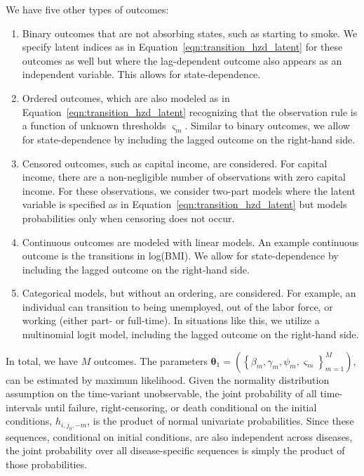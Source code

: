 \noindent We have five other types of outcomes: \\
\begin{enumerate}
\item Binary outcomes that are not absorbing states, such as starting to smoke. We specify latent
indices as in Equation~\ref{eqn:transition_hzd_latent} for these outcomes as well but where
the lag-dependent outcome also appears as an independent variable. This allows for state-dependence.

\item Ordered outcomes, which are also modeled as in Equation~\ref{eqn:transition_hzd_latent} recognizing that the observation rule is
a function of unknown thresholds $\varsigma_m$. Similar to binary outcomes, we allow for state-dependence by including the lagged outcome
on the right-hand side.

\item Censored outcomes, such as capital income, are considered. For capital income,
there are a non-negligible number of observations with zero capital income. For these observations, we consider
two-part models where the latent variable is specified as in Equation~\ref{eqn:transition_hzd_latent} but models
probabilities only when censoring does not occur.

\item Continuous outcomes are modeled with linear models. An example continuous outcome is the
transitions in log(BMI). We allow for state-dependence by including the lagged outcome on the right-hand side.

\item Categorical models, but without an ordering, are considered. For example, an individual can transition
to being unemployed, out of the labor force, or working (either part- or full-time). In situations like this, we utilize
a multinomial logit model, including the lagged outcome on the right-hand side.

\end{enumerate}

\noindent In total, we have $M$ outcomes. The parameters
$\mathbf{\theta}_1 = \left(\left\{\beta_m, \gamma_m, \psi_m, \varsigma_m\right\}_{m=1}^M \right)$,
can be estimated by maximum likelihood. Given the normality distribution assumption on the
time-variant unobservable, the joint probability of all time-intervals until failure, right-censoring,
or death conditional on the initial conditions, $h_{i,j_0,-m}$, is the product of
normal univariate probabilities. Since these sequences, conditional on initial
conditions, are also independent across diseases, the joint
probability over all disease-specific sequences is simply the product of
those probabilities. \\

